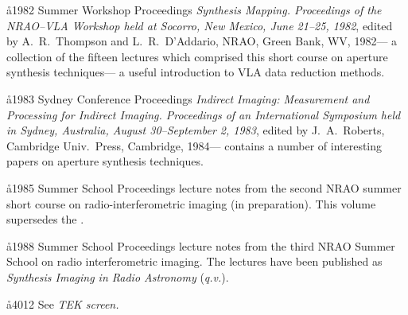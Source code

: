\aa{1982 Summer Workshop Proceedings}
{\it Synthesis Mapping. Proceedings of the NRAO--VLA Workshop
held at Socorro, New Mexico, June 21--25, 1982}, edited by
A.~R.~Thompson and L.~R.~D'Addario, NRAO, Green Bank, WV, 1982---%
a collection of the fifteen lectures which comprised
this short course on aperture synthesis techniques---%
a useful introduction to VLA data reduction methods.

\aa{1983 Sydney Conference Proceedings}
{\it Indirect Imaging: Measurement and Processing for Indirect Imaging.
Proceedings of an International Symposium held in Sydney, Australia,
August 30--September 2, 1983},
edited by J.~A.~Roberts, Cambridge Univ.\ Press, Cambridge, 1984---%
contains a number of interesting papers on aperture synthesis techniques.

\aa{1985 Summer School Proceedings}
lecture notes from the second NRAO summer short course on
radio-interferometric imaging (in preparation).
This volume supersedes the \wsp.

\aa{1988 Summer School Proceedings}
lecture notes from the third NRAO Summer School on radio interferometric
imaging.  The lectures have been published as {\it Synthesis Imaging in Radio
Astronomy} ({\it q.v.}).

\aa{4012} See {\it TEK screen.}
\vfill\eject
\hphantom{.}
\vfill\eject
\hphantom{.}
